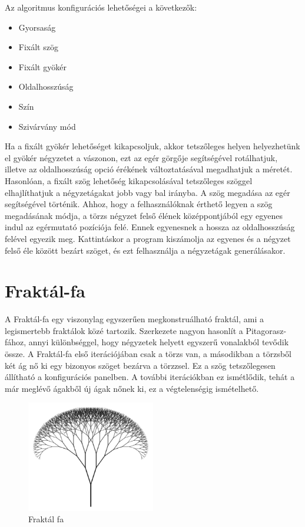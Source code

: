 \par Az algoritmus konfigurációs lehetőségei a következők:
\begin{itemize}
	\item Gyorsaság
	\item Fixált szög
	\item Fixált gyökér
	\item Oldalhosszúság
	\item Szín
	\item Szivárvány mód
\end{itemize}
Ha a fixált gyökér lehetőséget kikapcsoljuk, akkor tetszőleges helyen helyezhetünk el gyökér négyzetet a vászonon, ezt az egér görgője segítségével rotálhatjuk, illetve az oldalhosszúság opció érékének változtatásával megadhatjuk a méretét. Hasonlóan, a fixált szög lehetőség kikapcsolásával tetszőleges szöggel elhajlíthatjuk a négyzetágakat jobb vagy bal irányba. A szög megadása az egér segítségével történik. Ahhoz, hogy a felhasználóknak érthető legyen a szög megadásának módja, a törzs négyzet felső élének középpontjából egy egyenes indul az egérmutató pozíciója felé. Ennek egyenesnek a hossza az oldalhosszúság felével egyezik meg. Kattintáskor a program kiszámolja az egyenes és a négyzet felső éle között bezárt szöget, és ezt felhasználja a négyzetágak generálásakor.
\section*{Fraktál-fa}
A Fraktál-fa egy viszonylag egyszerűen megkonstruálható fraktál, ami a legismertebb fraktálok közé tartozik. Szerkezete nagyon hasonlít a Pitagorasz-fához, annyi különbséggel, hogy négyzetek helyett egyszerű vonalakból tevődik össze. A Fraktál-fa első iterációjában csak a törzs van, a másodikban a törzsből két ág nő ki egy bizonyos szöget bezárva a törzzsel. Ez a szög tetszőlegesen állítható a konfigurációs panelben. A további iterációkban ez ismétlődik, tehát a már meglévő ágakből új ágak nőnek ki, ez a végtelenségig ismételhető.  
\begin{figure}[!ht]
	\begin{center}
		\includegraphics[width=0.5\textwidth]{img/FractalTree}
		\caption[labelInTOC]{Fraktál fa}
	\end{center}
\end{figure}
